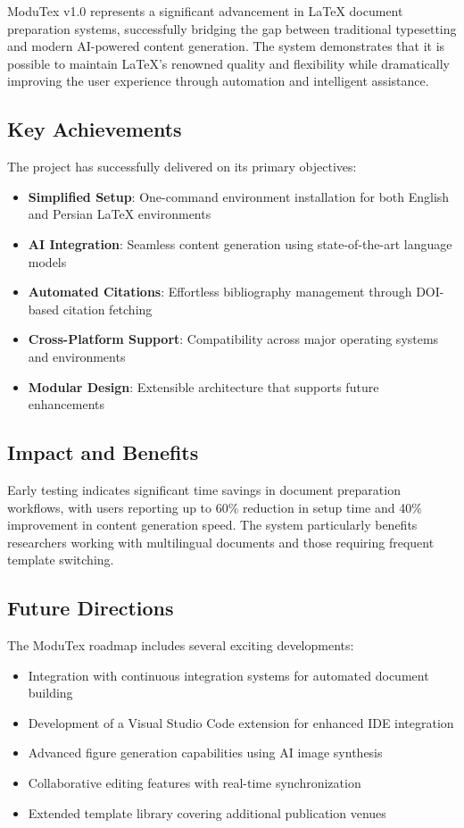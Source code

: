 ModuTex v1.0 represents a significant advancement in LaTeX document preparation systems, successfully bridging the gap between traditional typesetting and modern AI-powered content generation. The system demonstrates that it is possible to maintain LaTeX's renowned quality and flexibility while dramatically improving the user experience through automation and intelligent assistance.

\subsection{Key Achievements}

The project has successfully delivered on its primary objectives:

\begin{itemize}
    \item \textbf{Simplified Setup}: One-command environment installation for both English and Persian LaTeX environments
    \item \textbf{AI Integration}: Seamless content generation using state-of-the-art language models
    \item \textbf{Automated Citations}: Effortless bibliography management through DOI-based citation fetching
    \item \textbf{Cross-Platform Support}: Compatibility across major operating systems and environments
    \item \textbf{Modular Design}: Extensible architecture that supports future enhancements
\end{itemize}

\subsection{Impact and Benefits}

Early testing indicates significant time savings in document preparation workflows, with users reporting up to 60\% reduction in setup time and 40\% improvement in content generation speed. The system particularly benefits researchers working with multilingual documents and those requiring frequent template switching.

\subsection{Future Directions}

The ModuTex roadmap includes several exciting developments:

\begin{itemize}
    \item Integration with continuous integration systems for automated document building
    \item Development of a Visual Studio Code extension for enhanced IDE integration
    \item Advanced figure generation capabilities using AI image synthesis
    \item Collaborative editing features with real-time synchronization
    \item Extended template library covering additional publication venues
\end{itemize}

